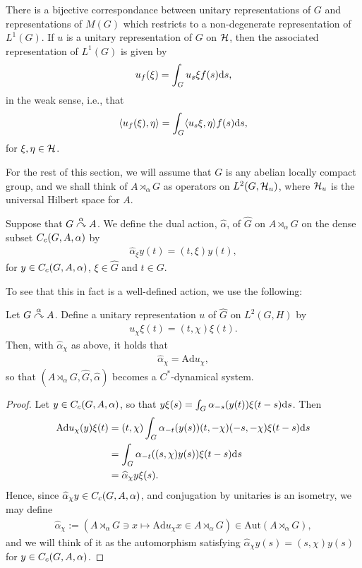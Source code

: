 \begin{proposition}
There is a bijective correspondance between unitary representations of $G$ and representations of $M(G)$ which restricts to a non-degenerate representation of $L^1(G)$. If $u$ is a unitary representation of $G$ on $\mathcal{H}$, then the associated representation of $L^1(G)$ is given by
\begin{align*}
	u_f(\xi) = \int_G u_s \xi f(s) \mathrm{d} s,
\end{align*}
in the weak sense, i.e., that 
\begin{align*}
	\langle u_f(\xi), \eta \rangle = \int_G \langle u_s \xi, \eta \rangle f(s) \mathrm{d} s,
\end{align*}
for $\xi, \eta \in \mathcal{H}$.
\end{proposition}

For the rest of this section, we will assume that $G$ is any abelian locally compact group, and we shall think of $A \rtimes_\alpha G$ as operators on $L^2(G,\mathcal{H}_u)$, where $\mathcal{H}_u$ is the universal Hilbert space for $A$.
\begin{definition}
Suppose that $G \stackrel{\alpha}{\curvearrowright} A$. We define the dual action, $\hat \alpha$, of $\hat G$ on $A \rtimes_\alpha G$ on the dense subset $C_c(G,A,\alpha)$ by
\begin{align*}
	\hat \alpha_\xi y(t) =  (t,\xi) y(t),
\end{align*}
for $y \in C_c(G,A,\alpha)$, $\xi \in \hat G$ and $t \in G$.
\end{definition}
To see that this in fact is a well-defined action, we use the following:
\begin{lemma}
Let $G \stackrel{\alpha}{\curvearrowright} A$. Define a unitary representation $u$ of $\hat G$ on $L^2(G,H)$ by
\begin{align*}
	u_\chi \xi(t) = (t, \chi) \xi(t).
\end{align*}
Then, with $\hat \alpha_\chi$ as above, it holds that
\begin{align*}
	\hat \alpha_\chi = \mathrm{Ad} u_\chi,
\end{align*}
so that $(A \rtimes_\alpha G, \hat G, \hat \alpha)$ becomes a $C^*$-dynamical system.
\label{dualaction}
\end{lemma}
\begin{proof}
Let $y \in C_c(G,A,\alpha)$, so that $y \xi(s) = \int_G \alpha_{-s}(y(t))\xi(t-s) \mathrm{d} s$. Then
\begin{align*}
	\mathrm{Ad} u_{\chi}(y) \xi(t) &= (t, \chi) \int_G \alpha_{-t}(y(s)) (t, - \chi)(-s,-\chi) \xi(t-s) \mathrm{d} s\\
	&= \int_G \alpha_{-t}( (s,\chi) y(s)) \xi(t-s) \mathrm{d} s \\
	&= \widehat{\alpha}_{\chi}y \xi(s).
\end{align*}
Hence, since $\widehat{\alpha}_\chi y \in C_c(G,A,\alpha)$, and conjugation by unitaries is an isometry, we may define 
\begin{align*}
	\hat \alpha_\chi := (A \rtimes_\alpha G \ni x \mapsto \mathrm{Ad} u_\chi x \in A \rtimes_\alpha G) \in \mathrm{Aut}(A \rtimes_\alpha G),
\end{align*}
and we will think of it as the automorphism satisfying $\hat \alpha_\chi y(s) = (s,\chi) y(s)$ for $y \in C_c(G,A,\alpha)$.
\end{proof}
